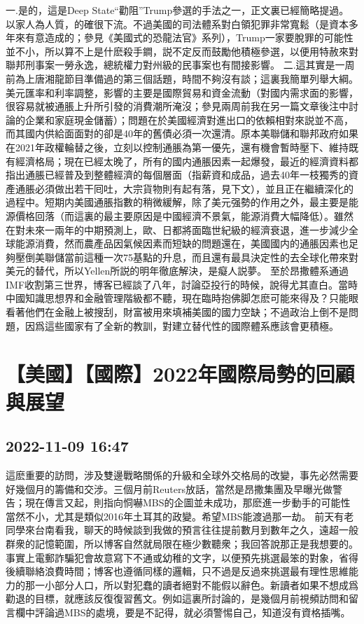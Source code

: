 \documentclass[twocolumn]{ctexart}
\begin{document}
一.是的，這是Deep State“勸阻”Trump參選的手法之一，正文裏已經簡略提過。以家人為人質，的確很下流。不過美國的司法體系對白領犯罪非常寬鬆（是資本多年來有意造成的；參見《美國式的恐龍法官》系列），Trump一家要脫罪的可能性並不小，所以算不上是什麽殺手鐧，説不定反而鼓勵他積極參選，以便用特赦來對聯邦刑事案一勞永逸，總統權力對州級的民事案也有間接影響。
二.這其實是一周前為上唐湘龍節目準備過的第三個話題，時間不夠沒有談；這裏我簡單列舉大綱。美元匯率和利率調整，影響的主要是國際貿易和資金流動（對國内需求面的影響，很容易就被通脹上升所引發的消費潮所淹沒；參見兩周前我在另一篇文章後注中討論的企業和家庭現金儲蓄）；問題在於美國經濟對進出口的依賴相對來説並不高，而其國内供給面面對的卻是40年的舊債必須一次還清。原本美聯儲和聯邦政府如果在2021年政權輪替之後，立刻以控制通脹為第一優先，還有機會暫時壓下、維持既有經濟格局；現在已經太晚了，所有的國内通脹因素一起爆發，最近的經濟資料都指出通脹已經普及到整體經濟的每個層面（指薪資和成品，過去40年一枝獨秀的資產通脹必須做出若干囘吐，大宗貨物則有起有落，見下文），並且正在繼續深化的過程中。短期内美國通脹指數的稍微緩解，除了美元强勢的作用之外，最主要是能源價格回落（而這裏的最主要原因是中國經濟不景氣，能源消費大幅降低）。雖然在對未來一兩年的中期預測上，歐、日都將面臨世紀級的經濟衰退，進一步減少全球能源消費，然而農產品因氣候因素而短缺的問題還在，美國國内的通脹因素也足夠壓倒美聯儲當前這種一次75基點的升息，而且還有最具決定性的去全球化帶來對美元的替代，所以Yellen所説的明年徹底解決，是癡人説夢。
至於昂撒體系通過IMF收割第三世界，博客已經談了八年，討論亞投行的時候，說得尤其直白。當時中國知識思想界和金融管理階級都不聽，現在臨時抱佛脚怎麽可能來得及？只能眼看著他們在金融上被搜刮，財富被用來填補美國的國力空缺；不過政治上倒不是問題，因爲這些國家有了全新的教訓，對建立替代性的國際體系應該會更積極。
\section*{【美國】【國際】2022年國際局勢的回顧與展望}
\subsection*{2022-11-09 16:47}

這麽重要的訪問，涉及雙邊戰略關係的升級和全球外交格局的改變，事先必然需要好幾個月的籌備和交涉。三個月前Reuters放話，當然是昂撒集團及早曝光做警告；現在傳言又起，則指向恫嚇MBS的企圖並未成功，那麽進一步動手的可能性當然不小，尤其是類似2016年土耳其的政變。希望MBS能渡過那一劫。
前天有老同學來台南看我，聊天的時候談到我做的預言往往提前數月到數年之久，遠超一般群衆的記憶範圍，所以博客自然就局限在極少數聽衆；我回答說那正是我想要的。事實上電郵詐騙犯會故意寫下不通或幼稚的文字，以便預先挑選最笨的對象，省得後續聯絡浪費時間；博客也遵循同樣的邏輯，只不過是反過來挑選最有理性思維能力的那一小部分人口，所以對犯蠢的讀者絕對不能假以辭色。新讀者如果不想成爲勸退的目標，就應該反復復習舊文。例如這裏所討論的，是幾個月前視頻訪問和留言欄中評論過MBS的處境，要是不記得，就必須警惕自己，知道沒有資格插嘴。
\end{document}
